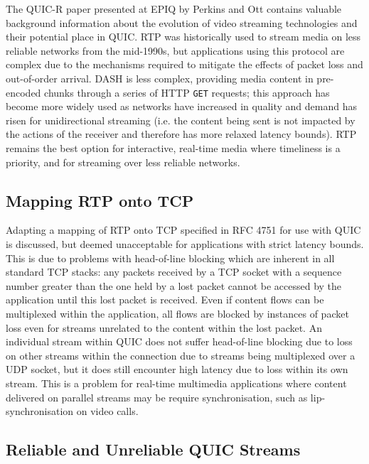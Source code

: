 \documentclass{mprop}
\begin{document}
The QUIC-R paper presented at EPIQ by Perkins and Ott contains valuable background information about the evolution of video streaming technologies and their potential place in QUIC. RTP was historically used to stream media on less reliable networks from the mid-1990s, but applications using this protocol are complex due to the mechanisms required to mitigate the effects of packet loss and out-of-order arrival. DASH is less complex, providing media content in pre-encoded chunks through a series of HTTP \texttt{GET} requests; this approach has become more widely used as networks have increased in quality and demand has risen for unidirectional streaming (i.e. the content being sent is not impacted by the actions of the receiver and therefore has more relaxed latency bounds). RTP remains the best option for interactive, real-time media where timeliness is a priority, and for streaming over less reliable networks.

\subsection{Mapping RTP onto TCP}

Adapting a mapping of RTP onto TCP specified in RFC 4751 \cite{RTP-TCP-RFC} for use with QUIC is discussed, but deemed unacceptable for applications with strict latency bounds. This is due to problems with head-of-line blocking which are inherent in all standard TCP stacks: any packets received by a TCP socket with a sequence number greater than the one held by a lost packet cannot be accessed by the application until this lost packet is received. Even if content flows can be multiplexed within the application, all flows are blocked by instances of packet loss even for streams unrelated to the content within the lost packet. An individual stream within QUIC does not suffer head-of-line blocking due to loss on other streams within the connection due to streams being multiplexed over a UDP socket, but it does still encounter high latency due to loss within its own stream. This is a problem for real-time multimedia applications where content delivered on parallel streams may be require synchronisation, such as lip-synchronisation on video calls.

\subsection{Reliable and Unreliable QUIC Streams}
\end{document}
